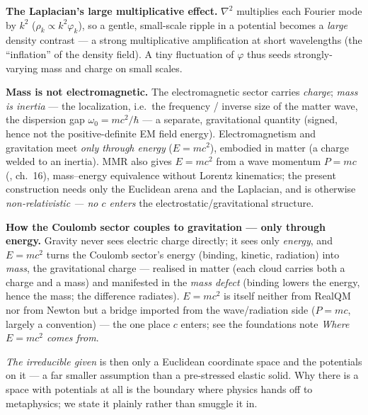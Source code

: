 \documentclass[11pt]{article}
\newcommand{\grad}{\nabla}
\begin{document}
\textbf{The Laplacian's large multiplicative effect.} $\grad^2$ multiplies each Fourier mode by $k^2$
($\rho_k\propto k^2\varphi_k$), so a gentle, small-scale ripple in a potential becomes a \emph{large}
density contrast --- a strong multiplicative amplification at short wavelengths (the ``inflation'' of the
density field). A tiny fluctuation of $\varphi$ thus seeds strongly-varying mass and charge on small scales.

\textbf{Mass is not electromagnetic.} The electromagnetic sector carries \emph{charge}; \emph{mass is
inertia} --- the localization, i.e.\ the frequency / inverse size of the matter wave, the dispersion gap
$\omega_0=mc^2/\hbar$ --- a separate, gravitational quantity (signed, hence not the positive-definite EM
field energy). Electromagnetism and gravitation meet \emph{only through energy} ($E=mc^2$), embodied in
matter (a charge welded to an inertia). MMR also gives $E=mc^2$ from a wave momentum $P=mc$
(\cite{mmr}, ch.~16), mass--energy equivalence without Lorentz kinematics; the present construction needs
only the Euclidean arena and the Laplacian, and is otherwise \emph{non-relativistic --- no $c$ enters} the
electrostatic/gravitational structure.

\textbf{How the Coulomb sector couples to gravitation --- only through energy.} Gravity never sees electric
charge directly; it sees only \emph{energy}, and $E=mc^2$ turns the Coulomb sector's energy (binding, kinetic,
radiation) into \emph{mass}, the gravitational charge --- realised in matter (each cloud carries both a charge
and a mass) and manifested in the \emph{mass defect} (binding lowers the energy, hence the mass; the difference
radiates). $E=mc^2$ is itself neither from RealQM nor from Newton but a bridge imported from the wave/radiation
side ($P=mc$, largely a convention) --- the one place $c$ enters; see the foundations note \emph{Where
$E=mc^2$ comes from}.

\emph{The irreducible given} is then only a Euclidean coordinate space and the potentials on it --- a far
smaller assumption than a pre-stressed elastic solid. Why there is a space with potentials at all is the
boundary where physics hands off to metaphysics; we state it plainly rather than smuggle it in.
\end{document}
